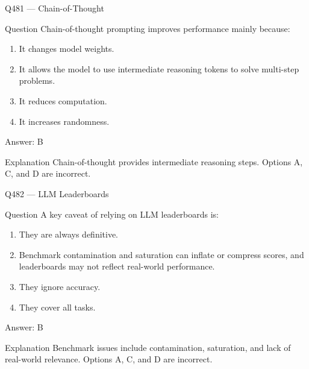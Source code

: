 \documentclass[aspectratio=169,8pt]{beamer}
\begin{document}
	\begin{frame}{Q481 --- Chain-of-Thought}
		\begin{block}{Question}
			Chain-of-thought prompting improves performance mainly because:
			\begin{enumerate}
				\item It changes model weights.
				\item It allows the model to use intermediate reasoning tokens to solve multi-step problems.
				\item It reduces computation.
				\item It increases randomness.
			\end{enumerate}
		\end{block}
		\begin{exampleblock}{Answer: B}\end{exampleblock}
		\begin{block}{Explanation}
			Chain-of-thought provides intermediate reasoning steps. Options A, C, and D are incorrect.
		\end{block}
	\end{frame}
	
	\begin{frame}{Q482 --- LLM Leaderboards}
		\begin{block}{Question}
			A key caveat of relying on LLM leaderboards is:
			\begin{enumerate}
				\item They are always definitive.
				\item Benchmark contamination and saturation can inflate or compress scores, and leaderboards may not reflect real-world performance.
				\item They ignore accuracy.
				\item They cover all tasks.
			\end{enumerate}
		\end{block}
		\begin{exampleblock}{Answer: B}\end{exampleblock}
		\begin{block}{Explanation}
			Benchmark issues include contamination, saturation, and lack of real-world relevance. Options A, C, and D are incorrect.
		\end{block}
	\end{frame}
	
\end{document}
